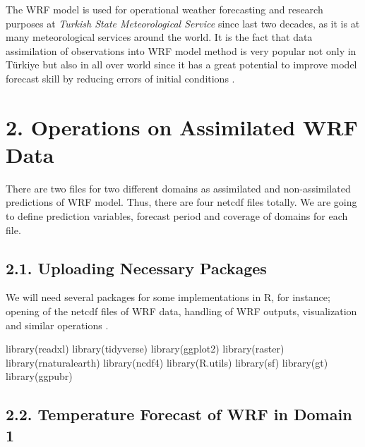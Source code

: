 \documentclass[
  letterpaper,
  DIV=11,
  numbers=noendperiod,
  abstract]{scrartcl}
\newenvironment{Shaded}{\begin{snugshade}}{\end{snugshade}}
\newcommand{\FunctionTok}[1]{\textcolor[rgb]{0.28,0.35,0.67}{#1}}
\newcommand{\NormalTok}[1]{\textcolor[rgb]{0.00,0.23,0.31}{#1}}
\begin{document}
The WRF model is used for operational weather forecasting and research
purposes at \emph{Turkish State Meteorological Service} since last two
decades, as it is at many meteorological services around the world. It
is the fact that data assimilation of observations into WRF model method
is very popular not only in Türkiye but also in all over world since it
has a great potential to improve model forecast skill by reducing errors
of initial conditions \autocite{yucel2014,yucel2015,bao2015,cheng2017}.

\hypertarget{operations-on-assimilated-wrf-data}{%
\section{2. Operations on Assimilated WRF
Data}\label{operations-on-assimilated-wrf-data}}

There are two files for two different domains as assimilated and
non-assimilated predictions of WRF model. Thus, there are four netcdf
files totally. We are going to define prediction variables, forecast
period and coverage of domains for each file.

\hypertarget{uploading-necessary-packages}{%
\subsection{2.1. Uploading Necessary
Packages}\label{uploading-necessary-packages}}

We will need several packages for some implementations in R, for
instance; opening of the netcdf files of WRF data, handling of WRF
outputs, visualization and similar operations
\autocite{readxl,tidyverse,ggplot2-2,ggpubr-2,raster,rnaturalearth,ncdf4,R.utils,sf,gt}.

\begin{Shaded}
\begin{Highlighting}[]
\FunctionTok{library}\NormalTok{(readxl)}
\FunctionTok{library}\NormalTok{(tidyverse)}
\FunctionTok{library}\NormalTok{(ggplot2)}
\FunctionTok{library}\NormalTok{(raster)}
\FunctionTok{library}\NormalTok{(rnaturalearth)}
\FunctionTok{library}\NormalTok{(ncdf4)}
\FunctionTok{library}\NormalTok{(R.utils)}
\FunctionTok{library}\NormalTok{(sf)}
\FunctionTok{library}\NormalTok{(gt)}
\FunctionTok{library}\NormalTok{(ggpubr)}
\end{Highlighting}
\end{Shaded}

\hypertarget{temperature-forecast-of-wrf-in-domain-1}{%
\subsection{2.2. Temperature Forecast of WRF in Domain
1}\label{temperature-forecast-of-wrf-in-domain-1}}
\end{document}
